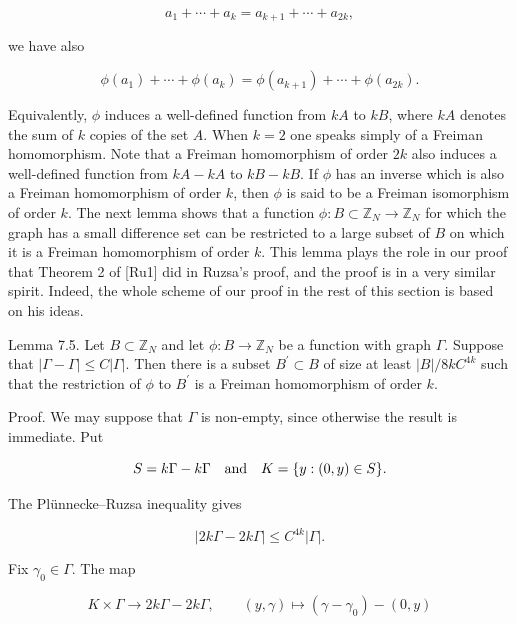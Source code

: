 \documentclass[10pt]{article}
\begin{document}
$$
a_{1}+\cdots+a_{k}=a_{k+1}+\cdots+a_{2 k},
$$

we have also

$$
\phi\left(a_{1}\right)+\cdots+\phi\left(a_{k}\right)=\phi\left(a_{k+1}\right)+\cdots+\phi\left(a_{2 k}\right) .
$$

Equivalently, $\phi$ induces a well-defined function from $k A$ to $k B$, where $k A$ denotes the sum of $k$ copies of the set $A$. When $k=2$ one speaks simply of a Freiman homomorphism. Note that a Freiman homomorphism of order $2 k$ also induces a well-defined function from $k A-k A$ to $k B-k B$. If $\phi$ has an inverse which is also a Freiman homomorphism of order $k$, then $\phi$ is said to be a Freiman isomorphism of order $k$. The next lemma shows that a function $\phi: B \subset \mathbb{Z}_{N} \rightarrow \mathbb{Z}_{N}$ for which the graph has a small difference set can be restricted to a large subset of $B$ on which it is a Freiman homomorphism of order $k$. This lemma plays the role in our proof that Theorem 2 of [Ru1] did in Ruzsa's proof, and the proof is in a very similar spirit. Indeed, the whole scheme of our proof in the rest of this section is based on his ideas.

Lemma 7.5. Let $B \subset \mathbb{Z}_{N}$ and let $\phi: B \rightarrow \mathbb{Z}_{N}$ be a function with graph $\Gamma$. Suppose that $|\Gamma-\Gamma| \leqslant C|\Gamma|$. Then there is a subset $B^{\prime} \subset B$ of size at least $|B| / 8 k C^{4 k}$ such that the restriction of $\phi$ to $B^{\prime}$ is a Freiman homomorphism of order $k$.

Proof. We may suppose that $\Gamma$ is non-empty, since otherwise the result is
immediate.  Put

$$
 S=k\Gamma-k\Gamma
 \quad\hbox{and}\quad
 K=\{y:(0,y)\in S\}.
$$

The Plünnecke--Ruzsa inequality gives

$$
 |2k\Gamma-2k\Gamma|\leqslant C^{4k}|\Gamma|.
$$

Fix $\gamma_{0}\in\Gamma$.  The map

$$
 K\times\Gamma\longrightarrow 2k\Gamma-2k\Gamma,\qquad
 (y,\gamma)\longmapsto(\gamma-\gamma_{0})-(0,y)
$$
\end{document}

